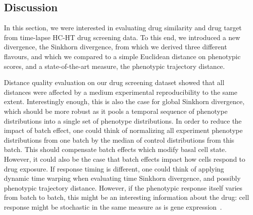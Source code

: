 
\subsection{Discussion}
In this section, we were interested in evaluating drug similarity and drug target from time-lapse HC-HT drug screening data. To this end, we introduced a new divergence, the Sinkhorn divergence, from which we derived three different flavours, and which we compared to a simple Euclidean distance on phenotypic scores, and a state-of-the-art measure, the phenotypic trajectory distance.

Distance quality evaluation on our drug screening dataset showed that
all distances were affected by a medium experimental reproducibility to the same
extent. Interestingly enough, this is also the case for global
Sinkhorn divergence, which should be more robust as it pools a
temporal sequence of phenotype distributions into a single set of
phenotype distributions. In order to reduce the impact of batch
effect, one could think of normalizing all experiment phenotype
distributions from one batch by the median of control distributions
from this batch. This should compensate batch effects which modify
basal cell state. However, it could also be the case that batch
effects impact how cells respond to drug exposure. If response timing
is different, one could think of applying dynamic time warping when
evaluating time Sinkhorn divergence, and possibly phenotypic
trajectory distance. However, if the phenotypic response itself varies
from batch to batch, this might be an interesting information about
the drug: cell response might be stochastic in the same measure as is
gene expression~\cite{pmid12183631}. %

